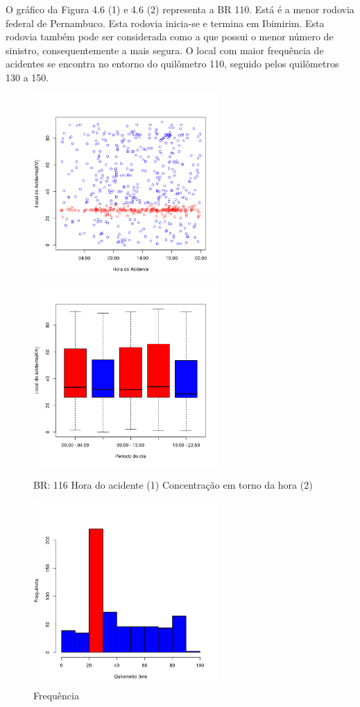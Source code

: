 O gráfico da Figura 4.6 (1) e 4.6 (2) representa a BR 110. Está é a menor rodovia federal de Pernambuco. Esta rodovia inicia-se e termina em Ibimirim. Esta rodovia também pode ser considerada como a que possui o menor número de sinistro, consequentemente a mais segura. O local com maior frequência de acidentes se encontra no entorno do quilômetro 110, seguido pelos quilômetros 130 a 150.

\pagebreak

\begin{figure}[h]
	\caption{BR: 116 Hora do acidente (1) Concentração em torno da hora (2)}
	\includegraphics[width=7cm,height=7cm]{Figuras/Preprocess/br116_1.png}
	\includegraphics[width=7cm,height=7cm]{Figuras/Preprocess/br116_2.png}

\end{figure}

\quad \quad
\begin{figure}[h]
	\centering
	\caption{ Frequência}
	\includegraphics[width=7cm,height=7cm]{Figuras/Preprocess/br116_3.png}
\end{figure}

